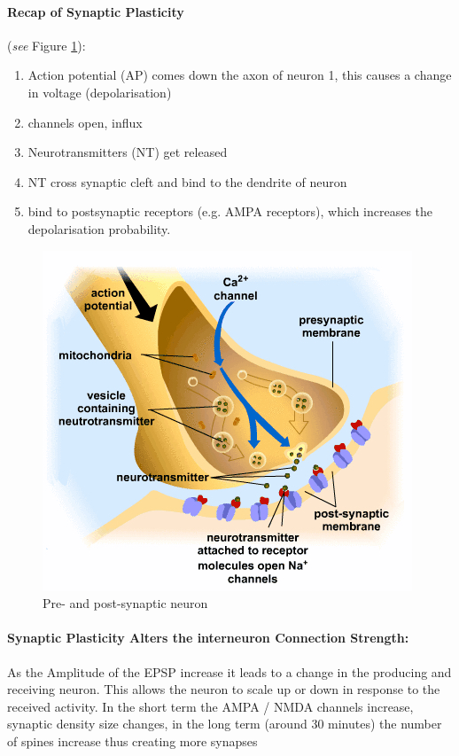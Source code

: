 \documentclass[main]{subfiles}
\begin{document}
\paragraph{Recap of Synaptic Plasticity} (\textit{see} Figure \ref{fig:syn_plast}):
\begin{enumerate}
    \item Action potential (AP) comes down the axon of neuron 1, this causes a change in  voltage (depolarisation)
    \item {} channels open,  influx
    \item Neurotransmitters (NT) get released
    \item NT cross synaptic cleft and bind to the dendrite of neuron
    \item bind to postsynaptic receptors (e.g. AMPA receptors), which increases the depolarisation probability.
\end{enumerate}

\begin{figure}[H]
    \centering
    \includegraphics[width=.6\textwidth]{03_PlasticityInTheBrain/figures/synaptic_plasticity.jpg}
    \caption{Pre- and post-synaptic neuron}
    \label{fig:syn_plast}
\end{figure}


\paragraph{Synaptic Plasticity Alters the interneuron Connection Strength:} As the Amplitude of the EPSP increase it leads to a change in the producing and  receiving neuron. This allows the neuron to scale up or down in response to the received activity. In the short term the AMPA / NMDA channels increase, synaptic density size changes, in the long term (around 30 minutes) the number of spines increase thus creating more synapses 
\end{document}
